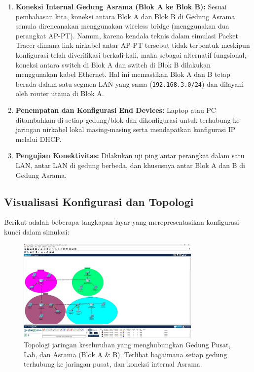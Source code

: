 \begin{enumerate}
    \item \textbf{Koneksi Internal Gedung Asrama (Blok A ke Blok B):}
        Sesuai pembahasan kita, koneksi antara Blok A dan Blok B di Gedung Asrama semula direncanakan menggunakan wireless bridge (menggunakan dua perangkat AP-PT). Namun, karena kendala teknis dalam simulasi Packet Tracer dimana link nirkabel antar AP-PT tersebut tidak terbentuk meskipun konfigurasi telah diverifikasi berkali-kali, maka sebagai alternatif fungsional, koneksi antara switch di Blok A dan switch di Blok B dilakukan menggunakan kabel Ethernet. Hal ini memastikan Blok A dan B tetap berada dalam satu segmen LAN yang sama (\texttt{192.168.3.0/24}) dan dilayani oleh router utama di Blok A.
    \item \textbf{Penempatan dan Konfigurasi End Devices:} Laptop atau PC ditambahkan di setiap gedung/blok dan dikonfigurasi untuk terhubung ke jaringan nirkabel lokal masing-masing serta mendapatkan konfigurasi IP melalui DHCP.
    \item \textbf{Pengujian Konektivitas:} Dilakukan uji ping antar perangkat dalam satu LAN, antar LAN di gedung berbeda, dan khususnya antar Blok A dan B di Gedung Asrama.
\end{enumerate}

\subsection{Visualisasi Konfigurasi dan Topologi}

Berikut adalah beberapa tangkapan layar yang merepresentasikan konfigurasi kunci dalam simulasi:

\begin{figure}[h!]
    \centering
    \includegraphics[width=0.8\textwidth]{img/Topologi.jpeg} 
    \caption{Topologi jaringan keseluruhan yang menghubungkan Gedung Pusat, Lab, dan Asrama (Blok A \& B). Terlihat bagaimana setiap gedung terhubung ke jaringan pusat, dan koneksi internal Asrama.}
    \label{fig:topologi_simulasi_keseluruhan}
\end{figure}
\clearpage 

